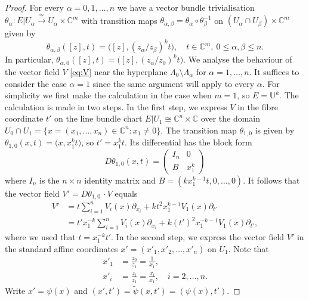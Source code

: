 \documentclass[10pt,a4paper]{amsart}
\newcommand\C{\mathbb{C}}
\newcommand\U{\mathbb{U}}
\newcommand\di{\partial}
\begin{document}
\begin{proof}
For every $\alpha=0,1,\ldots,n$ we have a vector bundle trivialisation 
$\theta_\alpha:E|U_\alpha\stackrel{\cong}{\to} U_\alpha\times \C^m$ 
with transition maps 
$\theta_{\alpha,\beta}=\theta_\alpha\circ \theta_\beta^{-1}$ on 
$(U_\alpha\cap U_\beta) \times \C^m$ given by 
\begin{equation}\label{eq:transition}
	\theta_{\alpha,\beta}([z],t) = \bigl([z],(z_\alpha/z_\beta)^k t\bigr),\quad 
	t\in\C^m, \ 0\le \alpha,\beta\le n.
\end{equation}
In particular, $\theta_{\alpha,0}([z],t)=\bigl([z],(z_\alpha/z_0)^k t\bigr)$.
We analyse the behaviour of the vector field $V$ \eqref{eq:V} 
near the hyperplane
$\Lambda_0\setminus \Lambda_\alpha$ for $\alpha=1,\ldots,n$. 
It suffices to consider the case $\alpha=1$ since the same argument 
will apply to every $\alpha$. 
For simplicity we first make the calculation in the case 
when $m=1$, so $E=\U^k$. The calculation is made in two steps. 
In the first step, we express $V$ in the fibre coordinate $t'$ on the 
line bundle chart $E|{U_1}\cong \C^n\times \C$ over the domain
$U_0\cap U_1 =\{x=(x_1,\ldots,x_n)\in \C^n: x_1\ne 0\}$.
The transition map $\theta_{1,0}$ is given by
$\theta_{1,0}(x,t)=\bigl(x,x_1^{k} t\bigr)$, so $t'=x_1^{k} t$. 
Its differential has the block form
\begin{equation}\label{eq:Dtheta}
	D\theta_{1,0}(x,t)=
	\begin{pmatrix}
	I_{n} & 0 \\
	B      & x_1^{k} 
	\end{pmatrix}
\end{equation}
where $I_n$ is the $n\times n$ identity matrix and
$B=(kx_1^{k-1} t,0,\ldots,0)$. It follows that the vector field
$V'=D\theta_{1,0} \, \cdotp V$ equals
\begin{align*} 
	V' &= t\sum_{i=1}^n V_i(x)\di_{x_i} + k t^2 x_1^{k-1}V_1(x) \di_{t'} \\
	   & = t' x_1^{-k}\sum_{i=1}^n V_i(x)\di_{x_i} + 
		k (t')^2 x_1^{-k-1} V_1(x) \di_{t'},
\end{align*} 
where we used that $t=x_1^{-k}t'$.
In the second step, we express the vector field $V'$ in the standard affine
coordinates $x'=(x'_1,x'_2,\ldots,x'_n)$ on $U_1$. Note that
\begin{align*}
	x'_1 &= \frac{z_0}{z_1} = \frac{1}{x_1},\\
	x'_i  &= \frac{z_i}{z_1} = \frac{x_i}{x_1},\quad i=2,\ldots,n. 	
\end{align*}
Write $x'=\psi(x)$ and $(x',t')=\tilde \psi(x,t')=(\psi(x),t')$. 

\end{proof}
\end{document}
